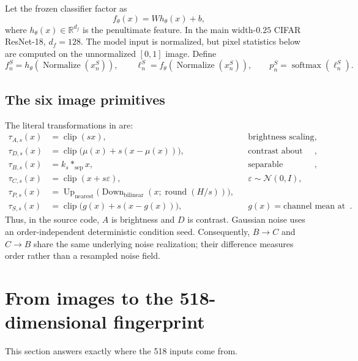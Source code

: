 \documentclass[11pt,a4paper]{article}
\newcommand{\R}{\mathbb{R}}
\begin{document}
Let the frozen classifier factor as
\[
f_\theta(x)=W h_\theta(x)+b,
\]
where $h_\theta(x)\in\R^{d_f}$ is the penultimate feature.  In the main
width-$0.25$ CIFAR ResNet-18, $d_f=128$.  The model input is normalized, but
pixel statistics below are computed on the unnormalized $[0,1]$ image.
Define
\[
f_n^S=h_\theta(\operatorname{Normalize}(x_n^S)),
\qquad
\ell_n^S=f_\theta(\operatorname{Normalize}(x_n^S)),
\qquad
p_n^S=\operatorname{softmax}(\ell_n^S).
\]

\subsection{The six image primitives}

The literal transformations in  are:
\begin{align}
\tau_{A,s}(x)&=\operatorname{clip}(s x), &&\text{brightness scaling},\\
\tau_{D,s}(x)&=\operatorname{clip}\big(\mu(x)+s(x-\mu(x))\big),
&&\text{contrast about the per-image mean},\\
\tau_{B,s}(x)&=k_s*_{\mathrm{sep}}x,
&&\text{separable Gaussian blur},\\
\tau_{C,s}(x)&=\operatorname{clip}(x+s\varepsilon),
&&\varepsilon\sim\mathcal{N}(0,I),\\
\tau_{P,s}(x)&=\operatorname{Up}_{\mathrm{nearest}}
\big(\operatorname{Down}_{\mathrm{bilinear}}(x;\operatorname{round}(H/s))\big),\\
\tau_{S,s}(x)&=\operatorname{clip}\big(g(x)+s(x-g(x))\big),
&&g(x)=\text{channel mean at each pixel}.
\end{align}
Thus, in the source code, $A$ is brightness and $D$ is contrast.  Gaussian
noise uses an order-independent deterministic condition seed.  Consequently,
$B\to C$ and $C\to B$ share the same underlying noise realization; their
difference measures order rather than a resampled noise field.

\section{From images to the 518-dimensional fingerprint}

This section answers exactly where the 518 inputs come from.
\end{document}
